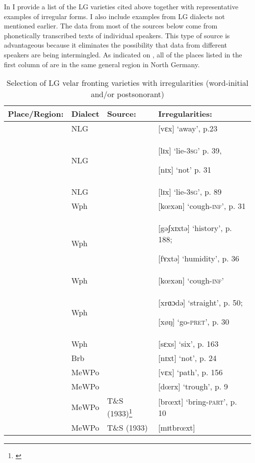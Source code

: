 In  I provide a list of the LG varieties cited above together with representative examples of irregular forms. I also include examples from LG dialects not mentioned earlier. The data from most of the sources below come from phonetically transcribed texts of individual speakers. This type of source is advantageous because it eliminates the possibility that data from different speakers are being intermingled. As indicated on , all of the places listed in the first column of  are in the same general region in North Germany.


\begin{table}
\caption{Selection of LG velar fronting varieties with irregularities (word-initial and/or postsonorant)\label{tab:12.36}}
\small
\begin{tabularx}{\textwidth}{lllQ}
\lsptoprule
Place/Region: & Dialect & Source: & Irregularities:\\
\midrule
{} & NLG & \citet{Kloeke1914} & [vɛx] ‘away’, p.23\\
 & NLG & \citet{Feyer1939} & [lɪx] ‘lie\textsc{{}-3sg}’ p. 39,

[nɪx] ‘not’ p. 31\\
 & NLG & \citet{Feyer1941} & [lɪx] ‘lie\textsc{{}-3sg}’, p. 89\\
 & Wph & \citet{Wix1921} & [kœxən] ‘cough\textsc{{}-inf}’, p. 31\\
 & Wph & \citet{Martin1925} & [gəʃxɪxtə] ‘history’,  p. 188;

[fʏxtə] ‘humidity’, p. 36\\
 & Wph & \citet{Frebel1957} & [kœxən] ‘cough\textsc{{}-inf}’\\
 & Wph & \citet{Bethge1970} & [xrɑɔdə]  ‘straight’, p. 50;

[xøŋ] ‘go-\textsc{pret}’, p. 30\\
 & Wph & \citet{Niebaum1974} & [sɛxs] ‘six’, p. 163\\
 & Brb & \citet{Seelmann1908} & [nɪxt] ‘not’, p. 24\\
 & MeWPo & \citet{Holst1907} & [vɛx] ‘path’, p. 156\\
 & MeWPo & \citet{Teuchert1927} & [dœrx] ‘trough’, p. 9\\
 & MeWPo & T\&S (1933)\footnote{\citep{TeuchertSchmitt1933}} & [brœxt] ‘bring-\textsc{part}’, p. 10\\
 & MeWPo & T\&S (1933) & [mɪtbrœxt]


\end{tabularx}
\end{table}
